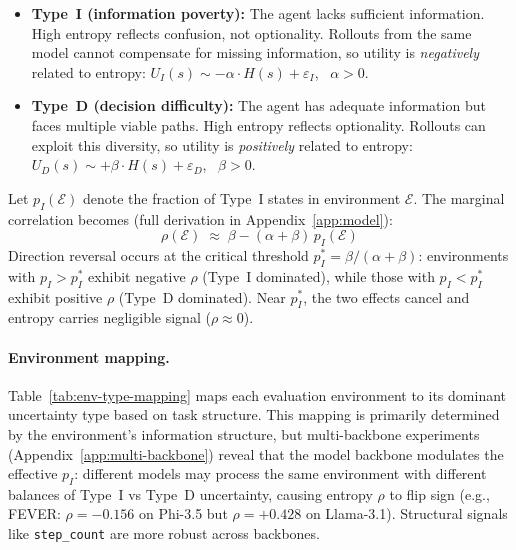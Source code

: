 \begin{itemize}[leftmargin=*,nosep]
\item \textbf{Type~I (information poverty):} The agent lacks
  sufficient information. High entropy reflects confusion, not
  optionality. Rollouts from the same model cannot compensate for
  missing information, so utility is \emph{negatively} related to
  entropy: $U_I(s) \sim -\alpha \cdot H(s) + \varepsilon_I$,
  \ $\alpha > 0$.

\item \textbf{Type~D (decision difficulty):} The agent has adequate
  information but faces multiple viable paths. High entropy reflects
  optionality. Rollouts can exploit this diversity, so utility is
  \emph{positively} related to entropy:
  $U_D(s) \sim +\beta \cdot H(s) + \varepsilon_D$, \ $\beta > 0$.
\end{itemize}

Let $p_I(\mathcal{E})$ denote the fraction of Type~I states in
environment $\mathcal{E}$. The marginal correlation becomes
(full derivation in Appendix~\ref{app:model}):
\begin{equation}
  \rho(\mathcal{E}) \;\approx\;
  \beta - (\alpha + \beta)\,p_I(\mathcal{E})
  \label{eq:direction}
\end{equation}
Direction reversal occurs at the critical threshold
$p_I^* = \beta/(\alpha+\beta)$: environments with $p_I > p_I^*$
exhibit negative $\rho$ (Type~I dominated), while those with
$p_I < p_I^*$ exhibit positive $\rho$ (Type~D dominated). Near
$p_I^*$, the two effects cancel and entropy carries negligible
signal ($\rho \approx 0$).

\paragraph{Environment mapping.}
Table~\ref{tab:env-type-mapping} maps each evaluation environment to
its dominant uncertainty type based on task structure.
This mapping is primarily determined by the environment's information
structure, but multi-backbone experiments
(Appendix~\ref{app:multi-backbone}) reveal that the model backbone
modulates the effective $p_I$: different models may process the same
environment with different balances of Type~I vs Type~D uncertainty,
causing entropy $\rho$ to flip sign (e.g., FEVER: $\rho{=}{-}0.156$
on Phi-3.5 but $\rho{=}{+}0.428$ on Llama-3.1). Structural signals
like \texttt{step\_count} are more robust across backbones.

